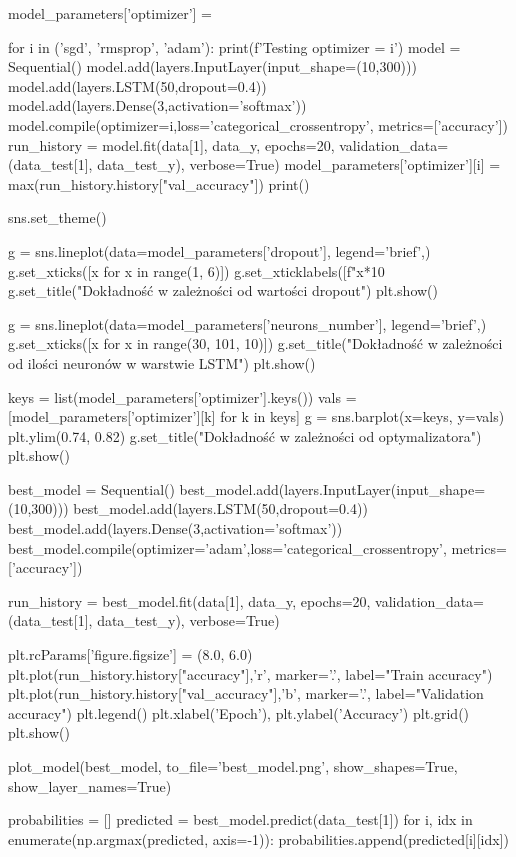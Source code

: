 \documentclass[11pt, a4paper, notitlepage]{report}
\begin{document}
\begin{appendices}
\begin{spverbatim}
model_parameters['optimizer'] = {}

for i in ('sgd', 'rmsprop', 'adam'):
  print(f'Testing optimizer = {i}')
  model = Sequential()
  model.add(layers.InputLayer(input_shape=(10,300)))
  model.add(layers.LSTM(50,dropout=0.4))
  model.add(layers.Dense(3,activation='softmax'))
  model.compile(optimizer=i,loss='categorical_crossentropy', metrics=['accuracy'])
  run_history = model.fit(data[1], data_y, epochs=20, validation_data=(data_test[1], data_test_y), verbose=True)
  model_parameters['optimizer'][i] = max(run_history.history["val_accuracy"])
  print()

sns.set_theme()

g = sns.lineplot(data=model_parameters['dropout'], legend='brief',)
g.set_xticks([x for x in range(1, 6)])
g.set_xticklabels([f"{x*10}%
g.set_title("Dokładność w zależności od wartości dropout")
plt.show()

g = sns.lineplot(data=model_parameters['neurons_number'], legend='brief',)
g.set_xticks([x for x in range(30, 101, 10)])
g.set_title("Dokładność w zależności od ilości neuronów w warstwie LSTM")
plt.show()

keys = list(model_parameters['optimizer'].keys())
vals = [model_parameters['optimizer'][k] for k in keys]
g = sns.barplot(x=keys, y=vals)
plt.ylim(0.74, 0.82)
g.set_title("Dokładność w zależności od optymalizatora")
plt.show()

best_model = Sequential()
best_model.add(layers.InputLayer(input_shape=(10,300)))
best_model.add(layers.LSTM(50,dropout=0.4))
best_model.add(layers.Dense(3,activation='softmax'))
best_model.compile(optimizer='adam',loss='categorical_crossentropy', metrics=['accuracy'])

run_history = best_model.fit(data[1], data_y, epochs=20, validation_data=(data_test[1], data_test_y), verbose=True)

plt.rcParams['figure.figsize'] = (8.0, 6.0)
plt.plot(run_history.history["accuracy"],'r', marker='.', label="Train accuracy")
plt.plot(run_history.history["val_accuracy"],'b', marker='.', label="Validation accuracy")
plt.legend()
plt.xlabel('Epoch'), plt.ylabel('Accuracy')
plt.grid()
plt.show()

plot_model(best_model, to_file='best_model.png', show_shapes=True, show_layer_names=True)

probabilities = []
predicted = best_model.predict(data_test[1])
for i, idx in enumerate(np.argmax(predicted, axis=-1)):
  probabilities.append(predicted[i][idx])


\end{spverbatim}
\end{appendices}
\end{document}
